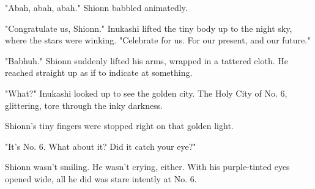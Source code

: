 "Abah, abah, abah." Shionn babbled animatedly.

"Congratulate us, Shionn." Inukashi lifted the tiny body up to the night
sky, where the stars were winking. "Celebrate for us. For our present,
and our future."

"Babhuh." Shionn suddenly lifted his arms, wrapped in a tattered cloth.
He reached straight up as if to indicate at something.

"What?" Inukashi looked up to see the golden city. The Holy City of No.
6, glittering, tore through the inky darkness.

Shionn's tiny fingers were stopped right on that golden light.

"It's No. 6. What about it? Did it catch your eye?"

Shionn wasn't smiling. He wasn't crying, either. With his purple-tinted
eyes opened wide, all he did was stare intently at No. 6.